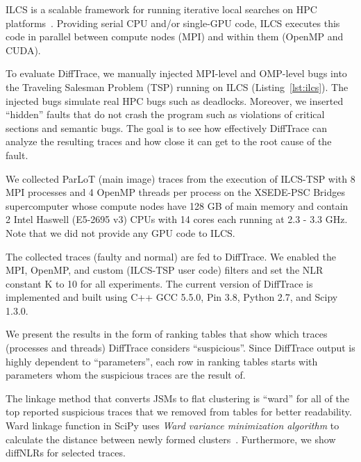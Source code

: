 ILCS is a scalable framework for running iterative local searches on HPC platforms~\cite{ilcs}.
%
Providing serial CPU and/or single-GPU code, ILCS executes this code in parallel between compute nodes (MPI) and within them (OpenMP and CUDA).
%

To evaluate DiffTrace, we manually injected MPI-level and OMP-level bugs into the Traveling Salesman Problem (TSP) running on ILCS (Listing~\ref{lst:ilcs}).
%
The injected bugs simulate real HPC bugs such as deadlocks.
%
%
Moreover, we inserted ``hidden'' faults that do not crash the program such as violations of critical sections and semantic bugs. 
%
%
The goal is to see how effectively DiffTrace can analyze the resulting traces and how close it can get to the root cause of the fault.
%


%
We collected ParLoT (main image) traces from the execution of ILCS-TSP with 8 MPI processes and 4 OpenMP threads per process on the XSEDE-PSC Bridges supercomputer whose compute nodes have 128 GB of main memory and contain 2 Intel Haswell (E5-2695 v3) CPUs with 14 cores each running at 2.3 - 3.3 GHz.
%
Note that we did not provide any GPU code to ILCS.
%

The collected traces (faulty and normal) are fed to DiffTrace. We enabled the MPI, OpenMP, and custom (ILCS-TSP user code) filters and set the NLR constant K to 10 for all experiments.
%
The current version of DiffTrace is implemented and built using C++ GCC 5.5.0, Pin 3.8, Python 2.7, and Scipy 1.3.0.

%
We present the results in the form of ranking tables that show which traces (processes and threads) DiffTrace considers ``suspicious''. Since DiffTrace output is highly dependent to ``parameters'', each row in ranking tables starts with parameters whom the suspicious traces are the result of.

The linkage method that converts JSMs to flat clustering is ``ward'' for all of the top reported suspicious traces that we removed from tables for better readability. Ward linkage function in SciPy uses \textit{Ward variance minimization algorithm} to calculate the distance between newly formed clusters~\cite{scipy}. Furthermore, we show diffNLRs for selected traces.



